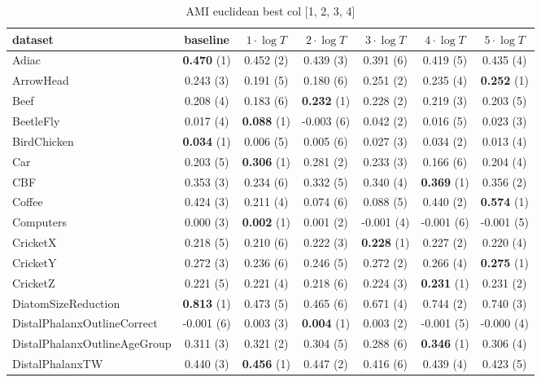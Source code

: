     \begin{table}[ht]
    \caption{AMI euclidean best col [1, 2, 3, 4]} 
    \begin{adjustbox}{width=\textwidth}
    \begin{tabular}{lcccccc}
    \hline
    dataset & baseline & \textbf{$1\cdot \log{T}$} & \textbf{$2\cdot \log{T}$} & \textbf{$3\cdot \log{T}$} & \textbf{$4\cdot \log{T}$} & \textbf{$5\cdot \log{T}$} \\ \hline
    Adiac & \textbf{0.470} (1) & 0.452 (2) & 0.439 (3) & 0.391 (6) & 0.419 (5) & 0.435 (4) \\
    ArrowHead & 0.243 (3) & 0.191 (5) & 0.180 (6) & 0.251 (2) & 0.235 (4) & \textbf{0.252} (1) \\
    Beef & 0.208 (4) & 0.183 (6) & \textbf{0.232} (1) & 0.228 (2) & 0.219 (3) & 0.203 (5) \\
    BeetleFly & 0.017 (4) & \textbf{0.088} (1) & -0.003 (6) & 0.042 (2) & 0.016 (5) & 0.023 (3) \\
    BirdChicken & \textbf{0.034} (1) & 0.006 (5) & 0.005 (6) & 0.027 (3) & 0.034 (2) & 0.013 (4) \\
    Car & 0.203 (5) & \textbf{0.306} (1) & 0.281 (2) & 0.233 (3) & 0.166 (6) & 0.204 (4) \\
    CBF & 0.353 (3) & 0.234 (6) & 0.332 (5) & 0.340 (4) & \textbf{0.369} (1) & 0.356 (2) \\
    Coffee & 0.424 (3) & 0.211 (4) & 0.074 (6) & 0.088 (5) & 0.440 (2) & \textbf{0.574} (1) \\
    Computers & 0.000 (3) & \textbf{0.002} (1) & 0.001 (2) & -0.001 (4) & -0.001 (6) & -0.001 (5) \\
    CricketX & 0.218 (5) & 0.210 (6) & 0.222 (3) & \textbf{0.228} (1) & 0.227 (2) & 0.220 (4) \\
    CricketY & 0.272 (3) & 0.236 (6) & 0.246 (5) & 0.272 (2) & 0.266 (4) & \textbf{0.275} (1) \\
    CricketZ & 0.221 (5) & 0.221 (4) & 0.218 (6) & 0.224 (3) & \textbf{0.231} (1) & 0.231 (2) \\
    DiatomSizeReduction & \textbf{0.813} (1) & 0.473 (5) & 0.465 (6) & 0.671 (4) & 0.744 (2) & 0.740 (3) \\
    DistalPhalanxOutlineCorrect & -0.001 (6) & 0.003 (3) & \textbf{0.004} (1) & 0.003 (2) & -0.001 (5) & -0.000 (4) \\
    DistalPhalanxOutlineAgeGroup & 0.311 (3) & 0.321 (2) & 0.304 (5) & 0.288 (6) & \textbf{0.346} (1) & 0.306 (4) \\
    DistalPhalanxTW & 0.440 (3) & \textbf{0.456} (1) & 0.447 (2) & 0.416 (6) & 0.439 (4) & 0.423 (5) \\

\end{tabular}
\end{adjustbox}
\end{table}
